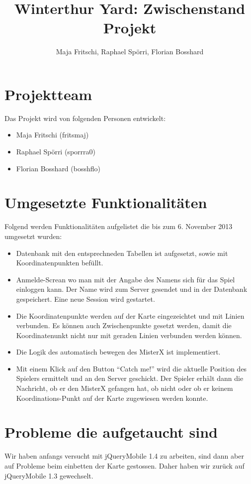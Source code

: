 \documentclass[11pt]{article}
\title{Winterthur Yard: Zwischenstand Projekt}
\author{Maja Fritschi, Raphael Spörri, Florian Bosshard}
\date{}
\begin{document}
\maketitle

\tableofcontents
\newpage

\section{Projektteam}
Das Projekt wird von folgenden Personen entwickelt:
\begin{itemize}
\item Maja Fritschi (fritsmaj)
\item Raphael Spörri (sporrra0)
\item Florian Bosshard (bosshflo)
\end{itemize}


\section{Umgesetzte Funktionalitäten}
Folgend werden Funktionalitäten aufgelistet die bis zum 6. November 2013 umgesetzt wurden: 
\begin{itemize}
\item Datenbank mit den entsprechneden Tabellen ist aufgesetzt, sowie mit Koordinatenpunkten befüllt.
\item Anmelde-Screan wo man mit der Angabe des Namens sich für das Spiel einloggen kann. Der Name wird zum Server gesendet und in der Datenbank gespeichert. Eine neue Session wird gestartet.
\item Die Koordinatenpunkte werden auf der Karte eingezeichtet und mit Linien verbunden. Es können auch Zwischenpunkte gesetzt werden, damit die Koordinatenunkt nicht nur mit geraden Linien verbunden werden können.
\item Die Logik des automatisch bewegen des MisterX ist implementiert.
\item Mit einem Klick auf den Button ``Catch me!'' wird die aktuelle Position des Spielers ermittelt und an den Server geschickt. Der Spieler erhält dann die Nachricht, ob er den MisterX gefangen hat, ob nicht oder ob er keinem Koordinations-Punkt auf der Karte zugewiesen werden konnte.
\end{itemize}


\section{Probleme die aufgetaucht sind}
Wir haben anfangs versucht mit jQueryMobile 1.4 zu arbeiten, sind dann aber auf Probleme beim einbetten der Karte gestossen. Daher haben wir zurück auf jQueryMobile 1.3 gewechselt.
\end{document}
